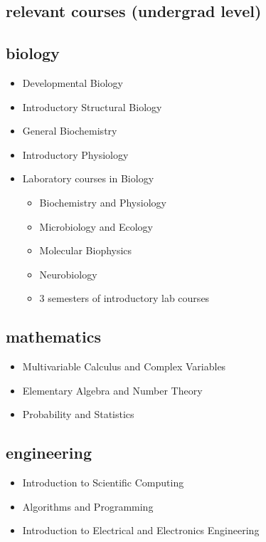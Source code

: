 \documentclass[11pt]{friggeri-cv}
\begin{document}
\begin{multicols}{2}[]
\begin{minipage}{1.1\columnwidth}



\section{relevant courses (undergrad level)}

\subsection{biology}
\begin{itemize}
\item Developmental Biology
\item Introductory Structural Biology
\item General Biochemistry
\item Introductory Physiology
\item Laboratory courses in Biology

\begin{itemize}
\item Biochemistry and Physiology
\item Microbiology and Ecology
\item Molecular Biophysics
\item Neurobiology
\item 3 semesters of introductory lab courses
\end{itemize}

\end{itemize}


\subsection{mathematics}
\begin{itemize}
\item Multivariable Calculus and Complex Variables
\item Elementary Algebra and Number Theory
\item Probability and Statistics
\end{itemize}



\subsection{engineering}
\begin{itemize}
\item Introduction to Scientific Computing
\item Algorithms and Programming
\item Introduction to Electrical and Electronics Engineering
\end{itemize}


\end{minipage}

\end{multicols}
\end{document}
